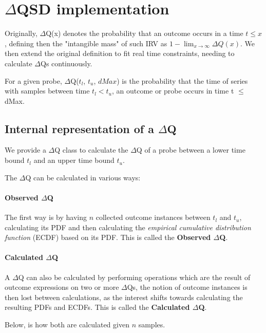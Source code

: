 \section{$\Delta$QSD implementation}

Originally, $\Delta$Q(x) denotes the probability that an outcome occurs in a time $t \le x$, defining then the "intangible mass" of such IRV as $1 - \lim_{x\to\infty} \Delta Q (x)$.
We then extend the original definition to fit real time constraints, needing to calculate $\Delta$Qs continuously.

For a given probe, $\Delta$Q($t_l$, $t_u$, $dMax$) is the probability that the time of series with samples between time $t_l < t_u$, an outcome or probe occurs in time t $\le$ dMax.

\subsection{Internal representation of a $\Delta$Q}
    We provide a $\Delta$Q class to calculate the $\Delta$Q of a probe between a lower time bound $t_l$ and an upper time bound $t_u$.
    
    The $\Delta$Q can be calculated in various ways: 
    
    \paragraph{Observed $\Delta$Q}
    
    The first way is by having $n$ collected outcome instances between $t_l$ and $t_u$, calculating its PDF and then calculating the \textit{empirical cumulative distribution function} (ECDF) based on its PDF. This is called the \textbf{Observed $\Delta$Q}.
    
    \paragraph{Calculated $\Delta$Q}
    
    A $\Delta$Q can also be calculated by performing operations which are the result of outcome expressions on two or more $\Delta$Qs, the notion of outcome instances is then lost between calculations, as the interest shifts towards calculating the resulting PDFs and ECDFs. This is called the \textbf{Calculated $\Delta$Q}.
    
    Below, is how both are calculated given $n$ samples.
    
